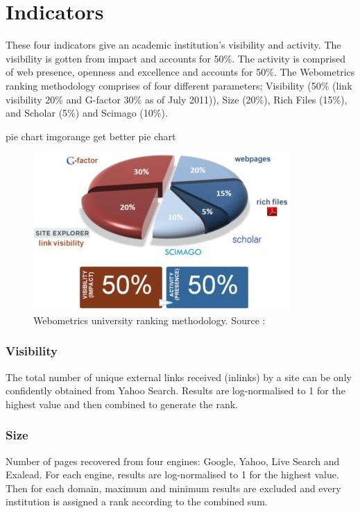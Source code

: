 \section{Indicators}
\noindent
These four indicators give an academic institution’s visibility and activity. The visibility is gotten from impact and accounts for 50\%. The activity is comprised of web presence, openness and excellence and accounts for 50\%. The Webometrics ranking methodology comprises of four different parameters; Visibility (50\% (link visibility 20\% and G-factor 30\% as of July 2011)), Size (20\%), Rich Files (15\%), and Scholar (5\%) and Scimago (10\%).
\begin {review_comment}{pie chart img}{orange}
{get better pie chart}
\end{review_comment}
\begin{figure}
	\includegraphics[width=\linewidth,scale=0.5]{../static/img/analysis_model.jpg}
	\caption{Webometrics university ranking methodology. Source :}
\end{figure}
\subsubsection{Visibility}
\noindent
The total number of unique external links received (inlinks) by a site can be only confidently obtained from Yahoo Search. Results are log-normalised to 1 for the highest value and
then combined to generate the rank.
\subsubsection{Size}
\noindent
Number of pages recovered from four engines: Google, Yahoo, Live Search and Exalead. For each engine, results are log-normalised to 1 for the highest value. Then for each domain, maximum
and minimum results are excluded and every institution is assigned a rank according to the combined sum.
